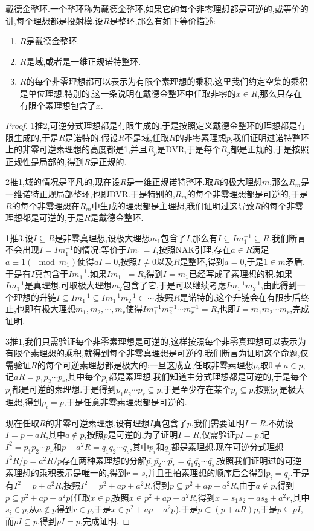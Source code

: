 戴德金整环.一个整环称为戴德金整环,如果它的每个非零理想都是可逆的,或等价的讲,每个理想都是投射模.设$R$是整环,那么有如下等价描述:
\begin{enumerate}
	\item $R$是戴德金整环.
	\item $R$是域,或者是一维正规诺特整环.
	\item $R$的每个非零理想都可以表示为有限个素理想的乘积.这里我们约定空集的乘积是单位理想.特别的,这一条说明在戴德金整环中任取非零的$x\in R$,那么只存在有限个素理想包含了$x$.
\end{enumerate}
\begin{proof}
	
	1推2,可逆分式理想都是有限生成的,于是按照定义戴德金整环的理想都是有限生成的,于是$R$是诺特的.假设$R$不是域,任取$R$的非零素理想$p$,我们证明过诺特整环上的非零可逆素理想的高度都是1,并且$R_p$是DVR,于是每个$R_p$都是正规的,于是按照正规性是局部的,得到$R$是正规的.
	
	2推1,域的情况是平凡的,现在设$R$是一维正规诺特整环.取$R$的极大理想$m$,那么$R_m$是一维诺特正规局部整环,也即DVR.于是特别的,$R_m$的每个非零理想都是可逆的,于是$R$的每个非零理想在$R_m$中生成的理想都是主理想,我们证明过这导致$R$的每个非零理想都是可逆的,于是$R$是戴德金整环.
	
	1推3,设$I\subseteq R$是非零真理想,设极大理想$m_1$包含了$I$,那么有$I\subseteq Im_1^{-1}\subseteq R$,我们断言不会出现$I=Im_1^{-1}$的情况:等价于$Im_1=I$,按照NAK引理,存在$a\in R$满足$a\equiv1(\mod m_1)$使得$aI=0$,按照$I\not=0$以及$R$是整环,得到$a=0$,于是$1\in m$矛盾.于是有$I$真包含于$Im_1^{-1}$.如果$Im_1^{-1}=R$,得到$I=m_1$已经写成了素理想的积.如果$Im_1^{-1}$是真理想,可取极大理想$m_2$包含了它,于是可以继续考虑$Im_1^{-1}m_2^{-1}$,由此得到一个理想的升链$I\subseteq Im_1^{-1}\subseteq Im_1^{-1}m_2^{-1}\subset\cdots$.按照$R$是诺特的,这个升链会在有限步后终止,也即有极大理想$m_1,m_2,\cdots,m_r$使得$Im_1^{-1}m_2^{-1}\cdots m_r^{-1}=R$,也即$I=m_1m_2\cdots m_r$,完成证明.
	
	3推1,我们只需验证每个非零素理想是可逆的,这样按照每个非零真理想可以表示为有限个素理想的乘积,就得到每个非零真理想是可逆的.我们断言为证明这个命题,仅需验证$R$的每个可逆素理想都是极大的:一旦这成立,任取非零素理想$p$,取$0\not=a\in p$,记$aR=p_1p_2\cdots p_r$,其中每个$p_i$都是素理想.我们知道主分式理想都是可逆的,于是每个$p_i$都是可逆的素理想.于是得到$p_1p_2\cdots p_r\subseteq p$,于是至少存在某个$p_i\subseteq p$,按照$p_i$是极大理想,得到$p_i=p$,于是任意非零素理想都是可逆的.
	
	现在任取$R$的非零可逆素理想,设有理想$I$真包含了$p$,我们需要证明$I=R$.不妨设$I=p+aR$,其中$a\not\in p$,按照$p$是可逆的,为了证明$I=R$,仅需验证$pI=p$.记$I^2=p_1p_2\cdots p_r$和$p+a^2R=q_1q_2\cdots q_s$,其中$p_i$和$q_j$都是素理想.现在可逆分式理想$I^2R/p=a^2R/p$存在两种素理想的分解$\overline{p_1}\overline{p_2}\cdots\overline{p_r}=\overline{q_1}\overline{q_2}\cdots\overline{q_s}$,按照我们证明过的可逆素理想的乘积表示是唯一的,得到$r=s$,并且重拍素理想的顺序后会得到$p_i=q_i$.于是有$I^2=p+a^2R$,按照$I^2=p^2+ap+a^2R$,得到$p\subseteq p^2+ap+a^2R$,由于$a\not\in p$,得到$p\subseteq p^2+ap+a^2p$(任取$x\in p$,按照$x\in p^2+ap+a^2R$,得到$x=s_1s_2+as_3+a^2r$,其中$s_i\in p$,从$a\not\in p$得到$r\in p$,于是$x\in p^2+ap+a^2p$).于是$p\subset(p+aR)p$,于是$p\subseteq pI$,而$pI\subseteq p$,得到$pI=p$,完成证明.
\end{proof}
